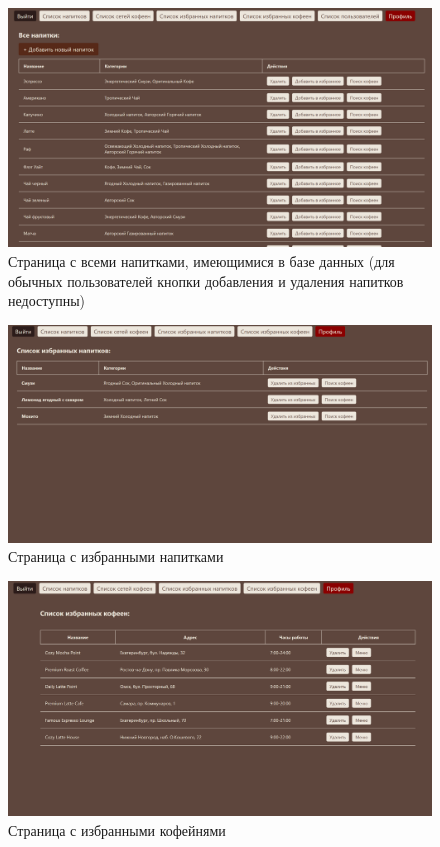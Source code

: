 \begin{figure}[H]
	\centering
	\includegraphics[width=1\linewidth]{img/interface/alldrinks_admin.png}
	\caption{Страница с всеми напитками, имеющимися в базе данных (для обычных пользователей кнопки добавления и удаления напитков недоступны)}
	\label{alldrinks}
\end{figure}

\begin{figure}[H]
	\centering
	\includegraphics[width=1\linewidth]{img/interface/favdrinks.png}
	\caption{Страница с избранными напитками}
	\label{favdrinks}
\end{figure}

\begin{figure}[H]
	\centering
	\includegraphics[width=1\linewidth]{img/interface/favcs.png}
	\caption{Страница с избранными кофейнями}
	\label{favcs}
\end{figure}

